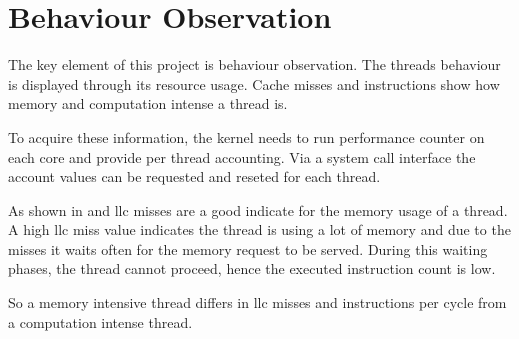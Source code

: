 \section{Behaviour Observation}
\label{design:behaviour}

The key element of this project is behaviour observation.
The threads behaviour is displayed through its resource usage.
Cache misses and instructions show how memory and computation intense a thread
is.

To acquire these information, the kernel needs to run performance counter on
each core and provide per thread accounting.
Via a system call interface the account values can be requested and reseted for
each thread.

As shown in \cite{zhuravlev_addressing_2010} and \cite{knauerhase_using_2008}
\gls{llc} misses are a good indicate for the memory usage of a thread.
A high \gls{llc} miss value indicates the thread is using a lot of memory and
due to the misses it waits often for the memory request to be served.
During this waiting phases, the thread cannot proceed, hence the executed
instruction count is low.

So a memory intensive thread differs in \gls{llc} misses and instructions per
cycle from a computation intense thread.




